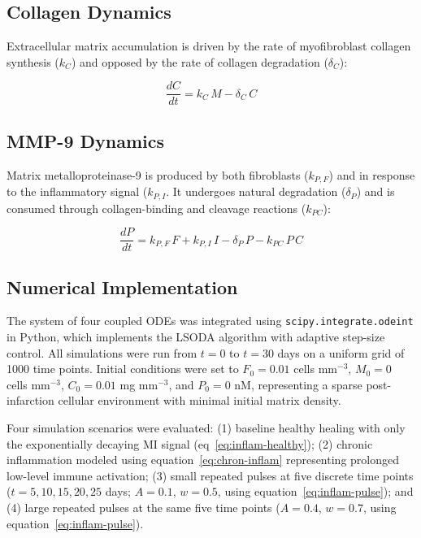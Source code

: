 \documentclass[Afour,sageh,times]{sagej}
\begin{document}
\subsection{Collagen Dynamics}

Extracellular matrix accumulation is driven by the rate of myofibroblast collagen synthesis ($k_C$) and opposed by the rate of collagen degradation ($\delta_C$):

\begin{equation}\label{eq:collagen}
\frac{dC}{dt} = k_C\, M - \delta_C\, C
\end{equation}

\subsection{MMP-9 Dynamics} \label{sec:mmp9}

Matrix metalloproteinase-9 is produced by both fibroblasts ($k_{P,F}$) and in response  to the inflammatory signal ($k_{P,I}$. It undergoes natural degradation ($\delta_P$) and is consumed through collagen-binding and cleavage reactions ($k_{PC}$):

\begin{equation}
\frac{dP}{dt} = k_{P,F}\, F + k_{P,I}\, I - \delta_P\, P - k_{PC}\, P\, C
\end{equation}

\subsection{Numerical Implementation}

The system of four coupled ODEs was integrated using \texttt{scipy.integrate.odeint} in Python, which implements the LSODA algorithm with adaptive step-size control. All simulations were run from $t = 0$ to $t = 30$ days on a uniform grid of 1000 time points. Initial conditions were set to $F_0 = 0.01$ cells mm$^{-3}$, $M_0 = 0$ cells mm$^{-3}$, $C_0 = 0.01$ mg mm$^{-3}$, and $P_0 = 0$ nM, representing a sparse post-infarction cellular environment with minimal initial matrix density.

Four simulation scenarios were evaluated: (1) baseline healthy healing with only the exponentially decaying MI signal (eq~\ref{eq:inflam-healthy}); (2) chronic inflammation modeled using equation~\ref{eq:chron-inflam} representing prolonged low-level immune activation; (3) small repeated pulses at five discrete time points ($t = 5, 10, 15, 20, 25$ days; $A = 0.1$, $w = 0.5$, using equation~\ref{eq:inflam-pulse}); and (4) large repeated pulses at the same five time points ($A = 0.4$, $w = 0.7$, using equation~\ref{eq:inflam-pulse}).
\end{document}
